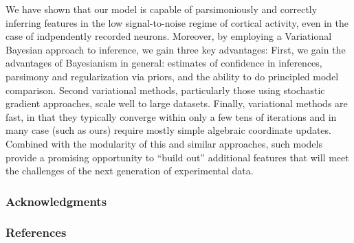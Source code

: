 \documentclass{article} %
\begin{document}
We have shown that our model is capable of parsimoniously and correctly inferring features in the low signal-to-noise regime of cortical activity, even in the case of indpendently recorded neurons. Moreover, by employing a Variational Bayesian approach to inference, we gain three key advantages: First, we gain the advantages of Bayesianism in general: estimates of confidence in inferences, parsimony and regularization via priors, and the ability to do principled model comparison. Second variational methods, particularly those using stochastic gradient approaches, scale well to large datasets. Finally, variational methods are fast, in that they typically converge within only a few tens of iterations and in many case (such as ours) require mostly simple algebraic coordinate updates. Combined with the modularity of this and similar approaches, such models provide a promising opportunity to ``build out'' additional features that will meet the challenges of the next generation of experimental data.



\subsubsection*{Acknowledgments}


\newpage
\subsubsection*{References}
\begingroup
\renewcommand{\section}[2]{}
{}

\endgroup
\end{document}
